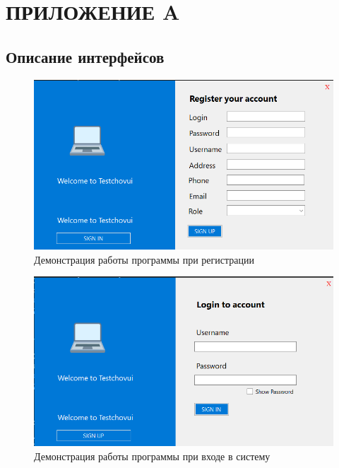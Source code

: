 \chapter*{ПРИЛОЖЕНИЕ A}

\section*{Описание интерфейсов}

\begin{figure}[h]
	\centering
	\includegraphics[height=0.2\textheight]{img/signup.png}
	\caption{Демонстрация работы программы при регистрации}
	\label{img:ex1}
\end{figure}

\begin{figure}[h]
	\centering
	\includegraphics[height=0.2\textheight]{img/signin.png}
	\caption{Демонстрация работы программы при входе в систему}
	\label{img:ex1a}
\end{figure}




